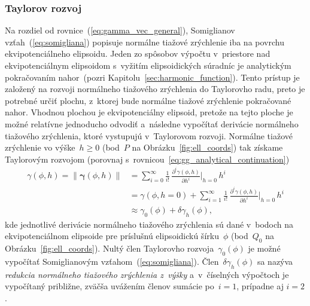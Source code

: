 \documentclass[a4paper, 12pt]{book}
\begin{document}
\subsubsection{Taylorov rozvoj}

Na rozdiel od rovnice~(\ref{eq:gamma_vec_general}), Somiglianov 
vzťah~(\ref{eq:somigliana}) popisuje normálne tiažové zrýchlenie iba na povrchu 
ekvipotenciálneho elipsoidu.  Jeden zo spôsobov výpočtu v~priestore nad 
ekvipotenciálnym elipsoidom s~vyžitím elipsoidických súradníc je analytickým 
pokračovaním nahor~(pozri Kapitolu~\ref{sec:harmonic_function}).  Tento prístup 
je založený na rozvoji normálneho tiažového zrýchlenia do Taylorovho radu, 
preto je potrebné určiť plochu, z~ktorej bude normálne tiažové zrýchlenie 
pokračované nahor.  Vhodnou plochou je ekvipotenciálny elipsoid, pretože na 
tejto ploche je možné relatívne jednoducho odvodiť a~následne vypočítať 
derivácie normálneho tiažového zrýchlenia, ktoré vystupujú v~Taylorovom 
rozvoji.  Normálne tiažové zrýchlenie vo výške~$h \geq 0$ (bod~$P$ na 
Obrázku~\ref{fig:ell_coords}) tak získame Taylorovým rozvojom (porovnaj 
s~rovnicou~\ref{eq:gg_analytical_continuation})
%
\begin{equation}
\label{eq:gamma_taylor}
\begin{split}
\gamma(\phi, h) = \| \boldsymbol \gamma(\phi, h) \| &= \sum_{i = 0}^{\infty} 
\frac{1}{i!} \, \frac{\partial^i \gamma(\phi, h)}{\partial h^i} \bigg\lvert_{h 
= 0} \, h^i\\
%
&= \gamma(\phi, h = 0) + \sum_{i = 1}^{\infty} \frac{1}{i!} \, \frac{\partial^i 
\gamma(\phi, h)}{\partial h^i} \bigg\lvert_{h = 0} \, h^i\\
%
&\approx \gamma_0(\phi) + \delta\gamma_h(\phi){,}
\end{split}
\end{equation}
%
kde jednotlivé derivácie normálneho tiažového zrýchlenia sú dané v~bodoch na 
ekvipotenciálnom elipsoide pre príslušnú elipsoidickú šírku~$\phi$ (bod~$Q_0$ 
na Obrázku~\ref{fig:ell_coords}).  Nultý člen Taylorovho 
rozvoja~$\gamma_0(\phi)$ je možné vypočítať Somiglianovým 
vzťahom~(\ref{eq:somigliana}).  Člen~$\delta\gamma_h(\phi)$ sa nazýva 
\emph{redukcia normálneho tiažového zrýchlenia z~výšky} a~v~číselných výpočtoch 
je vypočítaný približne, zväčša uvážením členov sumácie po~$i = 1$, prípadne aj 
$i = 2$.
\end{document}
